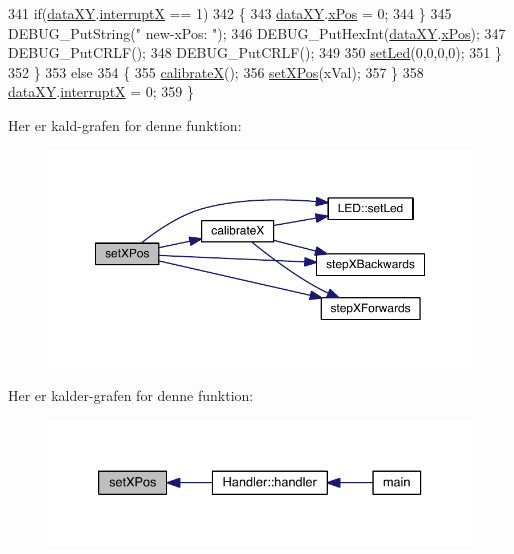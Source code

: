 \begin{DoxyCode}
341       \textcolor{keywordflow}{if}(\hyperlink{data_8h_a89d7998a721b3f36f9f4131e7a5e42d2}{dataXY}.\hyperlink{data_8h_a4cacb2964bb4b589bf79aa64a398725b}{interruptX} == 1)
342       \{
343         \hyperlink{data_8h_a89d7998a721b3f36f9f4131e7a5e42d2}{dataXY}.\hyperlink{data_8h_a5262e09f478a571552e65be75c506bdb}{xPos} = 0;
344       \}
345       DEBUG\_PutString(\textcolor{stringliteral}{" new-xPos: "});
346       DEBUG\_PutHexInt(\hyperlink{data_8h_a89d7998a721b3f36f9f4131e7a5e42d2}{dataXY}.\hyperlink{data_8h_a5262e09f478a571552e65be75c506bdb}{xPos});
347       DEBUG\_PutCRLF();
348       DEBUG\_PutCRLF();
349       
350       \hyperlink{led_8h_a1d8e725e3829da99c1d027ba0a2ce57a}{setLed}(0,0,0,0);
351     \}
352   \}
353   \textcolor{keywordflow}{else}
354   \{
355     \hyperlink{class_x_y_a852d7d757cec8e85e0b436969d0ce237}{calibrateX}();
356     \hyperlink{class_x_y_ac4bc2d178bbf432fc918391abd379af6}{setXPos}(xVal);
357   \}
358   \hyperlink{data_8h_a89d7998a721b3f36f9f4131e7a5e42d2}{dataXY}.\hyperlink{data_8h_a4cacb2964bb4b589bf79aa64a398725b}{interruptX} = 0;
359 \}
\end{DoxyCode}


Her er kald-\/grafen for denne funktion\+:\nopagebreak
\begin{figure}[H]
\begin{center}
\leavevmode
\includegraphics[width=350pt]{db/d87/class_x_y_ac4bc2d178bbf432fc918391abd379af6_cgraph}
\end{center}
\end{figure}




Her er kalder-\/grafen for denne funktion\+:\nopagebreak
\begin{figure}[H]
\begin{center}
\leavevmode
\includegraphics[width=333pt]{db/d87/class_x_y_ac4bc2d178bbf432fc918391abd379af6_icgraph}
\end{center}
\end{figure}


